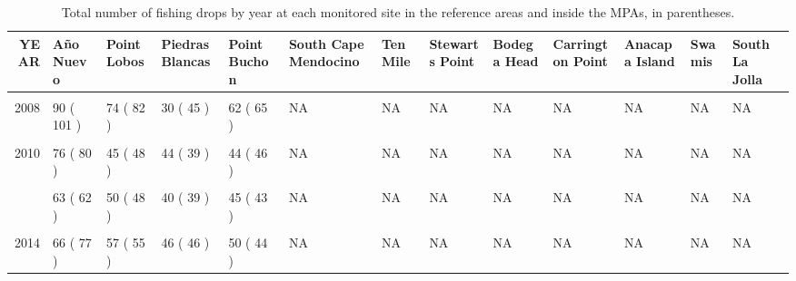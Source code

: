 \documentclass[
]{article}
\begin{document}
\begin{table}

\caption{\label{tab:fishingdrops}Total number of fishing drops by year at each monitored site in the reference areas and inside the MPAs, in parentheses.}
\centering
\begin{tabular}[t]{rllllllllllll}
\toprule
YEAR & Año Nuevo & Point Lobos & Piedras Blancas & Point Buchon & South Cape Mendocino & Ten Mile & Stewarts Point & Bodega Head & Carrington Point & Anacapa Island & Swamis & South La Jolla\\
\midrule
\cellcolor{gray!6}{2007} & \cellcolor{gray!6}{125 ( 72 )} & \cellcolor{gray!6}{70 ( 93 )} & \cellcolor{gray!6}{NA} & \cellcolor{gray!6}{64 ( 71 )} & \cellcolor{gray!6}{NA} & \cellcolor{gray!6}{NA} & \cellcolor{gray!6}{NA} & \cellcolor{gray!6}{NA} & \cellcolor{gray!6}{NA} & \cellcolor{gray!6}{NA} & \cellcolor{gray!6}{NA} & \cellcolor{gray!6}{NA}\\
2008 & 90 ( 101 ) & 74 ( 82 ) & 30 ( 45 ) & 62 ( 65 ) & NA & NA & NA & NA & NA & NA & NA & NA\\
\cellcolor{gray!6}{2009} & \cellcolor{gray!6}{78 ( 45 )} & \cellcolor{gray!6}{38 ( 45 )} & \cellcolor{gray!6}{38 ( 35 )} & \cellcolor{gray!6}{46 ( 40 )} & \cellcolor{gray!6}{NA} & \cellcolor{gray!6}{NA} & \cellcolor{gray!6}{NA} & \cellcolor{gray!6}{NA} & \cellcolor{gray!6}{NA} & \cellcolor{gray!6}{NA} & \cellcolor{gray!6}{NA} & \cellcolor{gray!6}{NA}\\
2010 & 76 ( 80 ) & 45 ( 48 ) & 44 ( 39 ) & 44 ( 46 ) & NA & NA & NA & NA & NA & NA & NA & NA\\
\cellcolor{gray!6}{2011} & \cellcolor{gray!6}{54 ( 58 )} & \cellcolor{gray!6}{40 ( 49 )} & \cellcolor{gray!6}{42 ( 36 )} & \cellcolor{gray!6}{44 ( 42 )} & \cellcolor{gray!6}{NA} & \cellcolor{gray!6}{NA} & \cellcolor{gray!6}{NA} & \cellcolor{gray!6}{NA} & \cellcolor{gray!6}{NA} & \cellcolor{gray!6}{NA} & \cellcolor{gray!6}{NA} & \cellcolor{gray!6}{NA}\\
\addlinespace
2012 & 63 ( 62 ) & 50 ( 48 ) & 40 ( 39 ) & 45 ( 43 ) & NA & NA & NA & NA & NA & NA & NA & NA\\
\cellcolor{gray!6}{2013} & \cellcolor{gray!6}{66 ( 71 )} & \cellcolor{gray!6}{58 ( 53 )} & \cellcolor{gray!6}{41 ( 38 )} & \cellcolor{gray!6}{40 ( 52 )} & \cellcolor{gray!6}{NA} & \cellcolor{gray!6}{NA} & \cellcolor{gray!6}{NA} & \cellcolor{gray!6}{NA} & \cellcolor{gray!6}{NA} & \cellcolor{gray!6}{NA} & \cellcolor{gray!6}{NA} & \cellcolor{gray!6}{NA}\\
2014 & 66 ( 77 ) & 57 ( 55 ) & 46 ( 46 ) & 50 ( 44 ) & NA & NA & NA & NA & NA & NA & NA & NA\\

\end{tabular}
\end{table}
\end{document}
